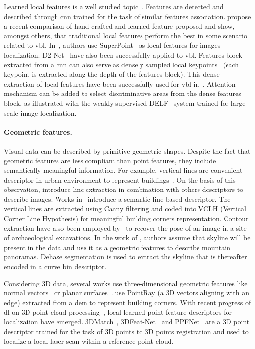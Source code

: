 	        Learned local features is a well studied topic~\citep{Carlevaris-Bianco2014,Paulin2015,Yi2016a,Ono2018a,Dusmanu2019,DeTone2017,Detone2018}. Features are detected and described through \ac{cnn} trained for the task of similar features association. \citet{Schonberger2017} propose a recent comparison of hand-crafted and learned feature proposed and show, amongst others, that traditional local features perform the best in some scenario related to \ac{vbl}. In~\cite{Sarlin2018a}, authors use SuperPoint~\citep{Detone2018} as local features for images localization. D2-Net~\citep{Dusmanu2019} have also been successfully applied to \ac{vbl}. Features block extracted from a \ac{cnn} can also serve as densely sampled local keypoints~\citep{Widya2018} (each keypoint is extracted along the depth of the features block). This dense extraction of local features have been successfully used for \ac{vbl} in~\citep{Piasco2019a,Taira2018}. Attention mechanism can be added to select discriminative areas from the dense features block, as illustrated with the weakly supervised DELF~\citep{Noh2017} system trained for large scale image localization.

		\paragraph{Geometric features.}
		 	Visual data can be described by primitive geometric shapes. Despite the fact that geometric features are less compliant than point features, they include semantically meaningful information. For example, vertical lines are convenient descriptor in urban environment to represent buildings~\citep{Arth2015,Morago2016,Ramalingam2011}. On the basis of this observation, \citet{Hays2008} introduce line extraction in combination with others descriptors to describe images. Works in~\citep{Cham2010} introduce a semantic line-based descriptor. The vertical lines are extracted using Canny filtering and coded into VCLH (Vertical Corner Line Hypothesis) for meaningful building corners representation. Contour extraction have also been employed by~\citet{Russell2011} to recover the pose of an image in a site of archaeological excavations. In the work of \citet{Baatz2012}, authors assume that skyline will be present in the data and use it as a geometric features to describe mountain panoramas. Dehaze segmentation is used to extract the skyline that is thereafter encoded in a curve bin descriptor.
		 	
		 	Considering 3D data, several works use three-dimensional geometric features like normal vectors~\citep{Li2016} or planar surfaces~\citep{Fernandez-Moral2013}. \citet{Bansal2014} use PointRay (\ie a 3D vectors aligning with an edge) extracted from a \ac{dem} to represent building corners. With recent progress of \ac{dl} on 3D point cloud processing~\citep{Qi2016a}, local learned point feature descriptors for localization have emerged. 3DMatch~\citep{Zeng2016}, 3DFeat-Net~\citep{Yew2018} and PPFNet~\citep{Deng2018} are a 3D point descriptor trained for the task of 3D points to 3D points registration and used to localize a local laser scan within a reference point cloud.
			
